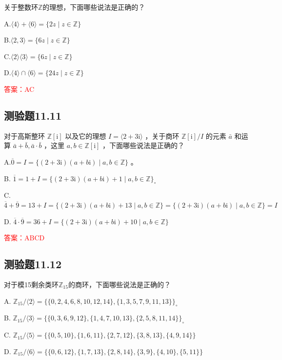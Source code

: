 \documentclass[UTF8, heading=true]{ctexart}
\begin{document}
关于整数环$\mathbb{Z}$的理想，下面哪些说法是正确的？

A.$\langle 4\rangle+\langle 6\rangle=\{2 z \mid z \in \mathbb{Z}\}$

B.$\langle 2,3\rangle=\{6 z \mid z \in \mathbb{Z}\}$

C.$\langle 2\rangle\langle 3\rangle=\{6 z \mid z \in \mathbb{Z}\}$

D.$\langle 4\rangle \cap\langle 6\rangle=\{24 z \mid z \in \mathbb{Z}\}$


\textcolor{red}{答案：AC}

\subsection{测验题11.11}

对于高斯整环 $\mathbb{Z}[\mathrm{i}]$ 以及它的理想 $I=\langle 2+3 \mathrm{i}\rangle$ ，关于商环 $\mathbb{Z}[\mathrm{i}] / I$ 的元素 $\bar{a}$ 和运算 $\bar{a}+\bar{b}, \bar{a} \cdot \bar{b}$ ，这里 $a, b \in \mathbb{Z}[\mathrm{i}]$ ，下面哪些说法是正确的？

A.$\overline{0}=I=\{(2+3 \mathrm{i})(a+b \mathrm{i}) \mid a, b \in \mathbb{Z}\}$ 。

B.
$
\overline{1}=1+I=\{(2+3 \mathrm{i})(a+b \mathrm{i})+1 \mid a, b \in \mathbb{Z}\}_{\circ}
$


C.
$
\overline{4}+\overline{9}=13+I=\{(2+3 \mathrm{i})(a+b \mathrm{i})+13 \mid a, b \in \mathbb{Z}\}=\{(2+3 \mathrm{i})(a+b \mathrm{i}) \mid a, b \in \mathbb{Z}\}=I
$


D.
$
\overline{4} \cdot \overline{9}=36+I=\{(2+3 \mathrm{i})(a+b \mathrm{i})+10 \mid a, b \in \mathbb{Z}\}
$

\textcolor{red}{答案：ABCD}


\subsection{测验题11.12}

对于模15剩余类环$\mathbb{Z}_{15}$的商环，下面哪些说法是正确的？

A.
$
\mathbb{Z}_{15} /\langle 2\rangle=\{\{0,2,4,6,8,10,12,14\},\{1,3,5,7,9,11,13\}\}_{\circ}
$


B.
$
\mathbb{Z}_{15} /\langle 3\rangle=\{\{0,3,6,9,12\},\{1,4,7,10,13\},\{2,5,8,11,14\}\}_{\circ}
$


C.
$
\mathbb{Z}_{15} /\langle 5\rangle=\{\{0,5,10\},\{1,6,11\},\{2,7,12\},\{3,8,13\},\{4,9,14\}\}
$


D.
$
\mathbb{Z}_{15} /\langle 6\rangle=\{\{0,6,12\},\{1,7,13\},\{2,8,14\},\{3,9\},\{4,10\},\{5,11\}\}
$
\end{document}
